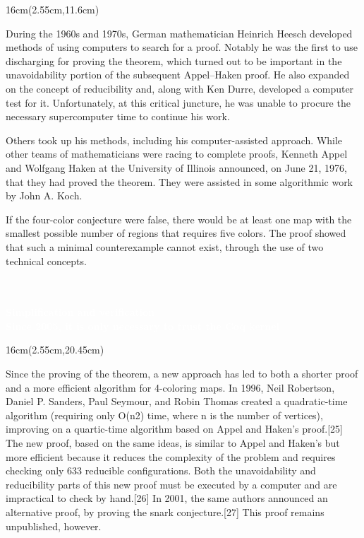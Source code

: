 \documentclass[11pt,a4paper,twoside]{book}
\newenvironment{positionedparagraph}[4]{%
	\begin{textblock*}{#1}(#2,#3)
		\noindent\textbf{#4}\par\medskip
	}{%
	\end{textblock*}
}
\begin{document}
\begin{positionedparagraph}{16cm}{2.55cm}{11.6cm}
	\\ During the 1960s and 1970s, German mathematician Heinrich Heesch developed methods of using computers to search for a proof. Notably he was the first to use discharging for proving the theorem, which turned out to be important in the unavoidability portion of the subsequent Appel–Haken proof. He also expanded on the concept of reducibility and, along with Ken Durre, developed a computer test for it. Unfortunately, at this critical juncture, he was unable to procure the necessary supercomputer time to continue his work.
	
	Others took up his methods, including his computer-assisted approach. While other teams of mathematicians were racing to complete proofs, Kenneth Appel and Wolfgang Haken at the University of Illinois announced, on June 21, 1976, that they had proved the theorem. They were assisted in some algorithmic work by John A. Koch.
	
	If the four-color conjecture were false, there would be at least one map with the smallest possible number of regions that requires five colors. The proof showed that such a minimal counterexample cannot exist, through the use of two technical concepts.
	

	
\end{positionedparagraph}

\begin{center}
\vspace{6.3cm}
\begin{tcolorbox}[colback=blue!48, colframe=blue!48, width=16cm, top=-0.3cm, bottom=0.2cm, boxrule=0pt, arc=0pt, outer arc=0pt, sharp corners]\textcolor{white}{\textbf{\\ \\  Simplification and verification \\[0.2cm]  \footnotesize Since 2005, it is only necessary to trust the Coq kernel\\[-0.3cm]}}
\end{tcolorbox}
\end{center}
\begin{positionedparagraph}{16cm}{2.55cm}{20.45cm}
\\ Since the proving of the theorem, a new approach has led to both a shorter proof and a more efficient algorithm for 4-coloring maps. In 1996, Neil Robertson, Daniel P. Sanders, Paul Seymour, and Robin Thomas created a quadratic-time algorithm (requiring only O(n2) time, where n is the number of vertices), improving on a quartic-time algorithm based on Appel and Haken's proof.[25] The new proof, based on the same ideas, is similar to Appel and Haken's but more efficient because it reduces the complexity of the problem and requires checking only 633 reducible configurations. Both the unavoidability and reducibility parts of this new proof must be executed by a computer and are impractical to check by hand.[26] In 2001, the same authors announced an alternative proof, by proving the snark conjecture.[27] This proof remains unpublished, however. 

\end{positionedparagraph}
\end{document}

